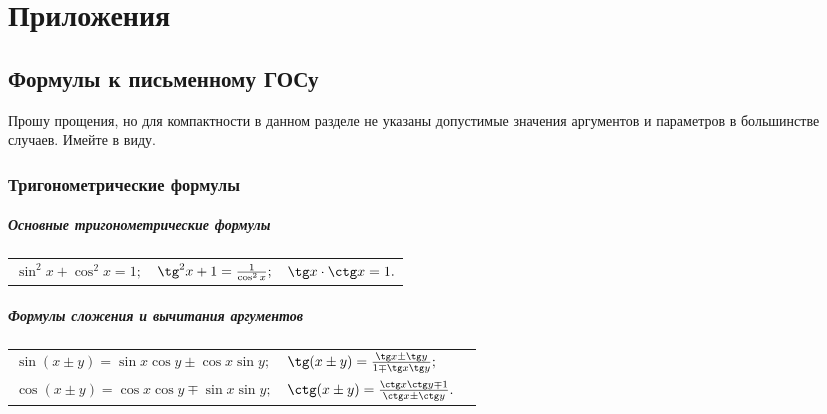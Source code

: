 \renewcommand*{\arraystretch}{1.5}
\everymath{\displaystyle}
\resetHeadWidth

\part{Приложения}
\chapter[Формулы к письменному ГОСу]{Формулы к письменному ГОСу}

Прошу прощения, но для компактности в данном разделе не указаны допустимые значения аргументов и параметров в большинстве случаев. Имейте в виду.

\section{Тригонометрические формулы}

\subsubsection{Основные тригонометрические формулы}
\begin{tabular}{ l l l }
$\sin^2x+\cos^2x=1;$
&
$\tg^2x+1=\frac{1}{\cos^2x};$
&
$\tg x\cdot\ctg x=1.$
\end{tabular}

\subsubsection{Формулы сложения и вычитания аргументов}
\begin{tabular}{ l l l}
$\sin(x\pm y)=\sin x \cos y \pm \cos x \sin y;$
&
$\tg(x\pm y)=\frac{\tg x \pm \tg y}{1 \mp \tg x\tg y};$
\\
$\cos(x\pm y)= \cos x \cos y \mp \sin x \sin y;$
&
$\ctg(x\pm y)=\frac{\ctg x\ctg y \mp 1}{\ctg x \pm \ctg y}.$
\end{tabular}

